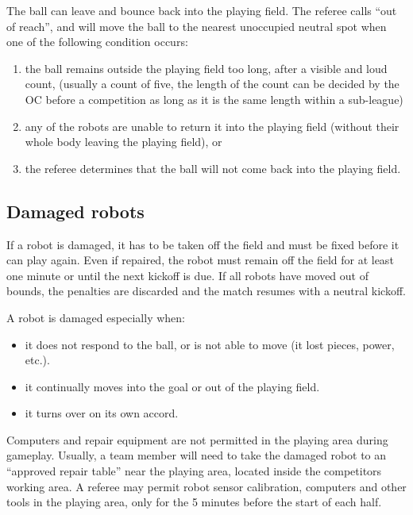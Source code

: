 \documentclass{article}
\begin{document}
The ball can leave and bounce back into the playing field. The referee calls
``out of reach'', and will move the ball to the nearest unoccupied neutral spot
when one of the following condition occurs:

\begin{enumerate}
    \item the ball remains outside the playing field too long,
        after a visible and loud count, (usually a count of five, the length of
        the count can be decided by the OC before a competition as long as it
        is the same length within a sub-league)

    \item any of the robots are unable to return it into the playing field
        (without their whole body leaving the playing field), or

    \item the referee determines that the ball will not come back into the
        playing field.

\end{enumerate}

\subsection{Damaged robots \label{ref-012}}

If a robot is damaged, it has to be taken off the field and must be fixed
before it can play again. Even if repaired, the robot must remain off the field
for at least one minute or until the next kickoff is due. If all robots have
moved out of bounds, the penalties are discarded and the match resumes with a
neutral kickoff.

A robot is damaged especially when:

\begin{itemize}

\item it does not respond to the ball, or is not able to move (it lost pieces,
    power, etc.).

\item it continually moves into the goal or out of the playing field.

\item it turns over on its own accord.

\end{itemize}

Computers and repair equipment are not permitted in the playing area during
gameplay. Usually, a team member will need to take the damaged robot to an
``approved repair table'' near the playing area, located inside the competitors
working area. A referee may permit robot sensor calibration, computers and
other tools in the playing area, only for the 5 minutes before the start of
each half.
\end{document}
